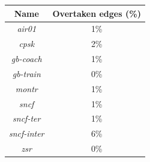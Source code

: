 \documentclass[]{beamer}
\begin{document}
\begin{frame}
\begin{columns}[c]
{\begin{table}
{\begin{tabular}{c|c}
	                    \hline
	                    \rowcolor{tablehead}
	                    \textbf{Name} & \textbf{Overtaken edges (\%)} \\
						\hline
						\textit{air01} & 1\% \\
						\textit{cpsk} & 2\% \\
						\textit{gb-coach} & 1\% \\
						\textit{gb-train} & 0\% \\
						\textit{montr} & 1\% \\
						\textit{sncf} & 1\% \\
						\textit{sncf-ter} & 1\% \\
						\textit{sncf-inter} & 6\% \\
						\textit{zsr} & 0\% \\
					\end{tabular}}
	            	\normalsize
				\end{table}}
			\end{columns}
        \end{frame}
        
\end{document}
